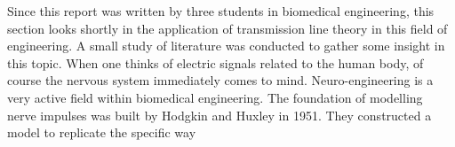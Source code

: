 Since this report was written by three students in biomedical engineering, this section looks shortly in the application of transmission line theory in this field of engineering. A small study of literature was conducted to gather some insight in this topic.
When one thinks of electric signals related to the human body, of course the nervous system immediately comes to mind. Neuro-engineering is a very active field within biomedical engineering. The foundation of modelling nerve impulses was built by Hodgkin and Huxley in 1951. They constructed a model to replicate the specific way